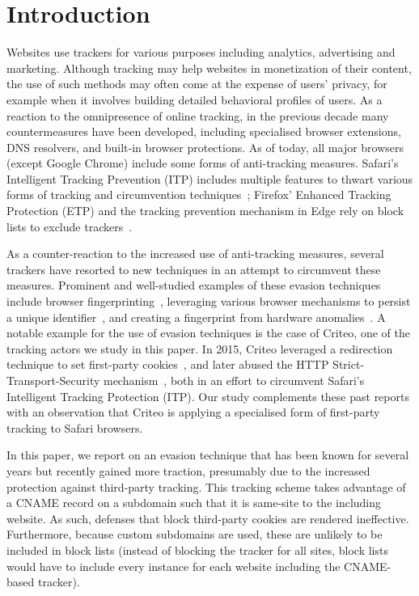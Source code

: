 \section{Introduction}
Websites use trackers for various purposes including analytics, advertising and marketing.
Although tracking may help websites in monetization of their content, 
the use of such methods may often come at the expense of users' privacy, for example when it involves building detailed behavioral profiles of users.
As a reaction to the omnipresence of online tracking, in the previous decade many countermeasures have been developed, including specialised  browser extensions, DNS resolvers, and built-in browser protections.
As of today, all major browsers (except Google Chrome) include some forms of anti-tracking measures. Safari's Intelligent Tracking Prevention (ITP) includes multiple features to thwart various forms of tracking and circumvention techniques~\cite{safarithirdpartycookieblock}; Firefox' Enhanced Tracking Protection (ETP) and the tracking prevention mechanism in Edge rely on block lists to exclude trackers~\cite{firefoxetp,edgetrackingprevention}.

As a counter-reaction to the increased use of anti-tracking measures, several trackers have resorted to new techniques in an attempt to circumvent these measures.
Prominent and well-studied examples of these evasion techniques include browser fingerprinting~\cite{eckersley2010unique,Acar:2014:WNF:2660267.2660347,nikiforakis2013cookieless,englehardt2016online,iqbal2020fingerprinting}, leveraging various browser mechanisms to persist a unique identifier~\cite{criteohsts, Apple-HSTS-Abuse,ayenson2011flash}, and creating a fingerprint from hardware anomalies~\cite{mavroudis2017privacy,dey2014accelprint,zhang2019sensorid}.
A notable example for the use of evasion techniques is the case of Criteo, one of the tracking actors we study in this paper. In 2015, Criteo leveraged a redirection technique to set first-party cookies~\cite{criteofirstparty,benguerah2017setting}, and later abused the HTTP Strict-Transport-Security mechanism~\cite{criteohsts, Apple-HSTS-Abuse}, both in an effort to circumvent Safari's Intelligent Tracking Protection (ITP). Our study complements these past reports with an observation that Criteo is applying a specialised form of first-party tracking to Safari browsers.

In this paper, we report on an evasion technique that has been known for several years but recently gained more traction, presumably due to the increased protection against third-party tracking.
This tracking scheme takes advantage of a CNAME record on a subdomain such that it is same-site to the including website.
As such, defenses that block third-party cookies are rendered ineffective.
Furthermore, because custom subdomains are used, these are unlikely to be included in block lists (instead of blocking the tracker for all sites, block lists would have to include every instance for each website including the CNAME-based tracker).

